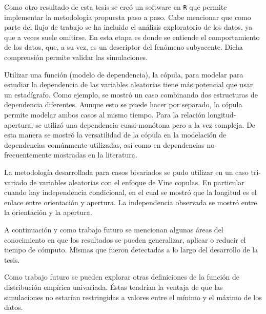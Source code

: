 
Como otro resultado de esta tesis se cre\'o un software en \verb|R| que permite implementar la metodolog\'ia propuesta paso a paso.
Cabe mencionar que como parte del flujo de trabajo se ha incluido el an\'alisis exploratorio de los datos, ya que a veces suele omitirse.
En esta etapa es donde se entiende el comportamiento de los datos, que, a su vez, es un descriptor del fen\'omeno subyacente.
Dicha comprensi\'on permite validar las simulaciones.

Utilizar una funci\'on (modelo de dependencia), la c\'opula, para modelar para estudiar la dependencia de las variables aleatorias tiene m\'as potencial que  usar un estad\'igrafo.
Como ejemplo, se mostr\'o un caso combinando dos estructuras de dependencia diferentes.
Aunque esto se puede hacer por separado, la c\'opula permite modelar ambos casos al mismo tiempo.
Para la relaci\'on longitud-apertura, se utiliz\'o una dependencia cuasi-mon\'otona pero a la vez compleja.
De esta manera se mostr\'o la versatilidad de la c\'opula en la modelaci\'on de dependencias com\'unmente utilizadas, as\'i como en dependencias no frecuentemente mostradas en la literatura.

La metodolog\'ia desarrollada para casos bivariados se pudo utilizar en un caso tri-variado de variables aleatorias con el enfoque de Vine copulas.
En particular cuando hay independencia condicional, en el cual se mostr\'o que la longitud es el enlace entre orientaci\'on y apertura. La independencia observada se mostr\'o entre la orientaci\'on y la apertura.

A continuaci\'on y como trabajo futuro se mencionan algunas \'areas del conocimiento en que los resultados se pueden generalizar, aplicar o reducir el tiempo de c\'omputo. Mismas que fueron detectadas a lo largo del desarrollo de la tesis.

Como trabajo futuro se pueden explorar otras definiciones de la funci\'on de distribuci\'on emp\'irica univariada. \'Estas tendr\'ian la ventaja de que las simulaciones no estar\'ian restringidas a valores entre el m\'inimo y el m\'aximo de los datos.

